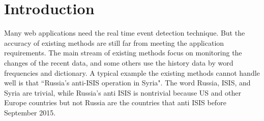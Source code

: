 \documentclass[conference,compsoc]{IEEEtran}
\begin{document}
\begin{abstract}

\end{abstract}


\section{Introduction}
Many web applications\cite{ge2015bring}\cite{hughes2009twitter}\cite{sakaki2010earthquake} need the real time event detection technique. 
But the accuracy of existing methods are still far from meeting the application requirements. 
The main stream of existing methods focus on monitoring the changes of the recent data\cite{Allan:2000wu}\cite{Petrovic:2010uj}\cite{Wurzer:2015wq}, and some others use the history data by word frequencies\cite{Li2013JointEE}\cite{Nguyen2015EventDA} and dictionary\cite{Twevent2012}. 
A typical example the existing methods cannot handle well is that ``Russia's anti-ISIS operation in Syria". The word Russia, ISIS, and Syria are trivial, while Russia's anti ISIS is nontrivial because US and other Europe countries but not Russia are the countries that anti ISIS  before September 2015. 
\end{document}
